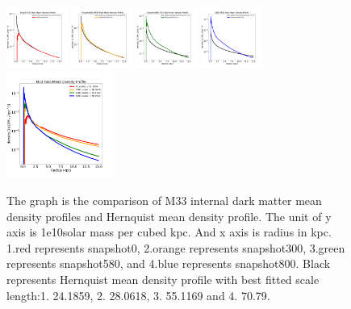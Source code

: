 \documentclass[twocolumn]{aastex63}
\begin{document}
\begin{figure}
    \includegraphics[width=2cm]{Snapshot0EnclosedvsHernquistMeanDensity.png}\hfill
    \includegraphics[width=2cm]{Snapshot300EnclosedvsHernquistMeanDensity.png}\hfill
    \includegraphics[width=2cm]{Snapshot580EnclosedVsHernquistMeanDensity.png}\hfill
    \includegraphics[width=2cm]{Snapshot800EnclosedVsHernquistMeanDensity.png}\hfill
    \\[\smallskipamount]
    \centering
    \includegraphics[width=3.5cm]{M33InternalMeanDensityProfile.png}
    \caption{The graph is the comparison of M33 internal dark matter mean density profiles and Hernquist mean density profile. The unit of y axis is 1e10solar mass per cubed kpc. And x axis is radius in kpc. 1.red represents snapshot0, 2.orange represents snapshot300, 3.green represents snapshot580, and 4.blue represents snapshot800. Black represents Hernquist mean density profile with best fitted scale length:1. 24.1859, 2. 28.0618, 3. 55.1169 and 4. 70.79.}
    \end{figure}
\end{document}
